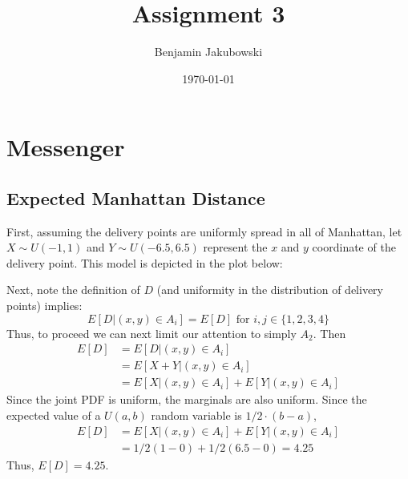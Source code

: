 \documentclass[paper=a4, fontsize=11pt]{scrartcl} %
\title{	Assignment 3}
\author{Benjamin Jakubowski} %
\date{\normalsize\today} %
\numberwithin{equation}{section} %
\numberwithin{figure}{section} %
\numberwithin{table}{section} %
\begin{document}
\maketitle %


\section{Messenger}

\subsection{Expected Manhattan Distance}

First, assuming the delivery points are uniformly spread in all of Manhattan, let $X \sim U(-1,1)$ and $Y \sim U(-6.5,6.5)$ represent the $x$ and $y$ coordinate of the delivery point. This model is depicted in the plot below:

\begin{center}
\end{center}

Next, note the definition of $D$ (and uniformity in the distribution of delivery points) implies:
\begin{equation*}
E[D | (x,y) \in A_i] = E[D] \textrm{  for  } i, j \in \{1,2,3,4\}
\end{equation*}
Thus, to proceed we can next limit our attention to simply $A_2$.  Then
\begin{align*}
E[D] &= E[D | (x,y) \in A_i] \\
   &= E[X + Y | (x,y) \in A_i] \\
   &= E[X | (x,y) \in A_i] + E[Y | (x,y) \in A_i]
\end{align*}
Since the joint PDF is uniform, the marginals are also uniform. Since the expected value of a $U(a,b)$ random variable is $1/2 \cdot (b - a)$,
\begin{align*}
E[D] &= E[X | (x,y) \in A_i] + E[Y | (x,y) \in A_i]\\
   &= 1/2 (1 - 0) + 1/2 (6.5 - 0) = 4.25
\end{align*}
Thus, $E[D] =4.25$.
\end{document}
